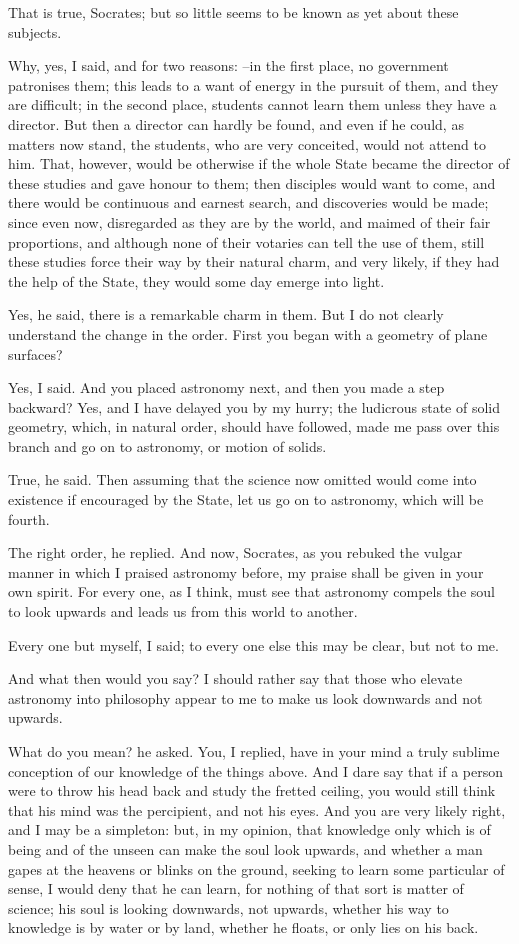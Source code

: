 That is true, Socrates; but so little seems to be known as yet about these subjects.

Why, yes, I said, and for two reasons: --in the first place, no government patronises them; this leads to a want of energy in the pursuit of them, and they are difficult; in the second place, students cannot learn them unless they have a director. But then a director can hardly be found, and even if he could, as matters now stand, the students, who are very conceited, would not attend to him. That, however, would be otherwise if the whole State became the director of these studies and gave honour to them; then disciples would want to come, and there would be continuous and earnest search, and discoveries would be made; since even now, disregarded as they are by the world, and maimed of their fair proportions, and although none of their votaries can tell the use of them, still these studies force their way by their natural charm, and very likely, if they had the help of the State, they would some day emerge into light.

Yes, he said, there is a remarkable charm in them. But I do not clearly understand the change in the order. First you began with a geometry of plane surfaces?

Yes, I said.
And you placed astronomy next, and then you made a step backward?
Yes, and I have delayed you by my hurry; the ludicrous state of solid geometry, which, in natural order, should have followed, made me pass over this branch and go on to astronomy, or motion of solids.

True, he said.
Then assuming that the science now omitted would come into existence if encouraged by the State, let us go on to astronomy, which will be fourth.

The right order, he replied. And now, Socrates, as you rebuked the vulgar manner in which I praised astronomy before, my praise shall be given in your own spirit. For every one, as I think, must see that astronomy compels the soul to look upwards and leads us from this world to another.

Every one but myself, I said; to every one else this may be clear, but not to me.

And what then would you say?
I should rather say that those who elevate astronomy into philosophy appear to me to make us look downwards and not upwards.

What do you mean? he asked.
You, I replied, have in your mind a truly sublime conception of our knowledge of the things above. And I dare say that if a person were to throw his head back and study the fretted ceiling, you would still think that his mind was the percipient, and not his eyes. And you are very likely right, and I may be a simpleton: but, in my opinion, that knowledge only which is of being and of the unseen can make the soul look upwards, and whether a man gapes at the heavens or blinks on the ground, seeking to learn some particular of sense, I would deny that he can learn, for nothing of that sort is matter of science; his soul is looking downwards, not upwards, whether his way to knowledge is by water or by land, whether he floats, or only lies on his back.

